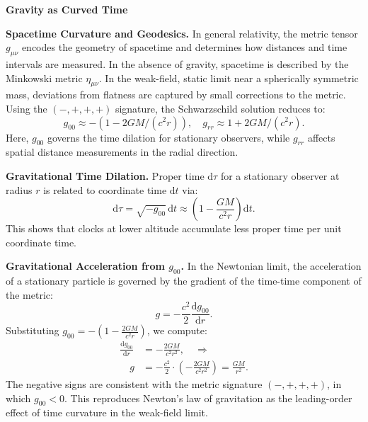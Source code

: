 \begin{technical}

{\Large\textbf{Gravity as Curved Time}}

\textbf{Spacetime Curvature and Geodesics.}  
In general relativity, the metric tensor \( g_{\mu\nu} \) encodes the geometry of spacetime and determines how distances and time intervals are measured. In the absence of gravity, spacetime is described by the Minkowski metric \( \eta_{\mu\nu} \). In the weak-field, static limit near a spherically symmetric mass, deviations from flatness are captured by small corrections to the metric. Using the \( (-,+,+,+) \) signature, the Schwarzschild solution reduces to:
\begin{equation}
g_{00} \approx -\left(1 - {2GM}/{(c^2 r)}\right), \quad g_{rr} \approx 1 + {2GM}/{(c^2 r)}.
\end{equation}
Here, \( g_{00} \) governs the time dilation for stationary observers, while \( g_{rr} \) affects spatial distance measurements in the radial direction.

\textbf{Gravitational Time Dilation.}  
Proper time \( \mathrm{d}\tau \) for a stationary observer at radius \( r \) is related to coordinate time \( \mathrm{d}t \) via:
\begin{equation}
\mathrm{d}\tau = \sqrt{-g_{00}}\, \mathrm{d}t \approx \left(1 - \frac{GM}{c^2 r} \right) \mathrm{d}t.
\end{equation}
This shows that clocks at lower altitude accumulate less proper time per unit coordinate time.

\textbf{Gravitational Acceleration from \( g_{00} \).}  
In the Newtonian limit, the acceleration of a stationary particle is governed by the gradient of the time-time component of the metric:
\begin{equation}
g = -\frac{c^2}{2} \frac{\mathrm{d} g_{00}}{\mathrm{d} r}.
\end{equation}
Substituting \( g_{00} = -\left(1 - \frac{2GM}{c^2 r} \right) \), we compute:
\begin{align}
\frac{\mathrm{d} g_{00}}{\mathrm{d} r} &= -\frac{2GM}{c^2 r^2}, \quad \Rightarrow \\\quad g 
&= -\frac{c^2}{2} \cdot \left(-\frac{2GM}{c^2 r^2}\right) = \frac{GM}{r^2}.
\end{align}
The negative signs are consistent with the metric signature \( (-,+,+,+) \), in which \( g_{00} < 0 \). This reproduces Newton’s law of gravitation as the leading-order effect of time curvature in the weak-field limit.


\end{technical}
